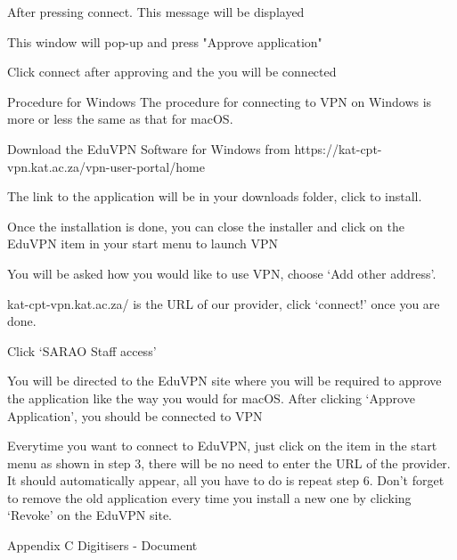 After pressing connect. This message will be displayed

This window will pop-up and press "Approve application"













Click connect after approving and the you will be connected

Procedure for Windows
The procedure for connecting to VPN on Windows is more or less the same as that for macOS. 

Download the EduVPN Software for Windows from https://kat-cpt-vpn.kat.ac.za/vpn-user-portal/home
















The link to the application will be in your downloads folder, click to install.

Once the installation is done, you can close the installer and click on the EduVPN item in your start menu to launch VPN


You will be asked how you would like to use VPN, choose ‘Add other address’.

 kat-cpt-vpn.kat.ac.za/ is the URL of our provider, click ‘connect!’ once you are done. 

Click ‘SARAO Staff access’

You will be directed to the EduVPN site where you will be required to approve the application like the way you would for macOS. After clicking ‘Approve Application’, you should be connected to VPN


Everytime you want to connect to EduVPN, just click on the item in the start menu as shown in step 3, there will be no need to  enter the URL of the provider. It should automatically appear, all you have to do is repeat step 6.
Don’t forget to remove the old application every time you install a new one by clicking ‘Revoke’ on the EduVPN site. 




Appendix C
Digitisers - Document
